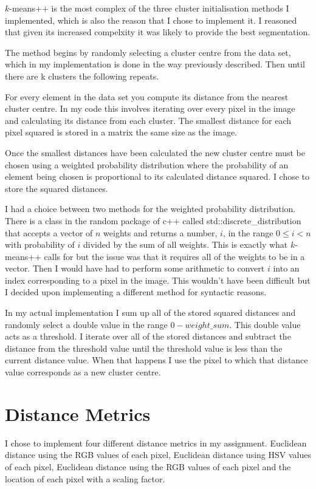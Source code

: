 \documentclass{article}
\begin{document}
$k$-means++ is the most complex of the three cluster initialisation methods I implemented, which is also the reason that I chose to implement it. I reasoned that given its increased compelxity it was likely to provide the best segmentation.  

The method begins by randomly selecting a cluster centre from the data set, which in my implementation is done in the way previously described. Then until there are k clusters the following repeats. 

For every element in the data set you compute its distance from the nearest cluster centre. In my code this involves iterating over every pixel in the image and calculating its distance from each cluster. The smallest distance for each pixel squared is stored in a matrix the same size as the image.

Once the smallest distances have been calculated the new cluster centre must be chosen using a weighted probability distribution where the probability of an element being chosen is proportional to its calculated distance squared. I chose to store the squared distances.

I had a choice between two methods for the weighted probability distribution. There is a class in the random package of c++ called std::discrete\_distribution that accepts a vector of $n$ weights and returns a number, $i$, in the range $0 \leq i < n$ with probability of $i$ divided by the sum of all weights. This is exactly what $k$-means++ calls for but the issue was that it requires all of the weights to be in a vector. Then I would have had to perform some arithmetic to convert $i$ into an index corresponding to a pixel in the image. This wouldn't have been difficult but I decided upon implementing a different method for syntactic reasons. 

In my actual implementation I sum up all of the stored squared distances and randomly select a double value in the range $0-weight\_sum$. This double value acts as a threshold. I iterate over all of the stored distances and subtract the distance from the threshold value until the threshold value is less than the current distance value. When that happens I use the pixel to which that distance value corresponds as a new cluster centre. 

\section{Distance Metrics}
I chose to implement four different distance metrics in my assignment. Euclidean distance using the RGB values of each pixel, Euclidean distance using HSV values of each pixel, Euclidean distance using the RGB values of each pixel and the location of each pixel with a scaling factor.
\end{document}
